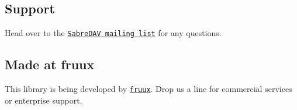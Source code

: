 \subsection*{Support }

Head over to the \href{http://groups.google.com/group/sabredav-discuss}{\tt Sabre\+D\+AV mailing list} for any questions.

\subsection*{Made at fruux }

This library is being developed by \href{https://fruux.com/}{\tt fruux}. Drop us a line for commercial services or enterprise support. 